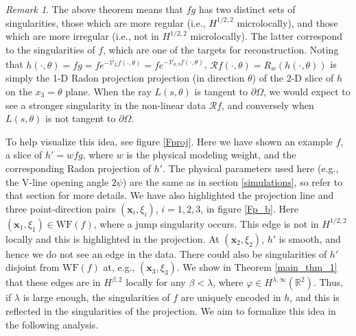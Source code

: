 \documentclass[a4paper,12pt]{amsart}
\numberwithin{equation}{section}
\theoremstyle{plain}
\numberwithin{theorem}{section}
\theoremstyle{definition}
\theoremstyle{remark}
\newtheorem{remark}[theorem]{Remark}
\theoremstyle{remark}
\theoremstyle{remark}
\newcommand{\WF}{\mathrm{WF}}                         %
\newcommand{\vx}{{\mathbf{x}}}
\newcommand{\seanc}[1]{\begin{quotation}\textbf{Sean's comment:\
}{\textit{#1}}\end{quotation}}
\begin{document}

\begin{remark}
The above theorem means that $fg$ has two distinct sets of singularities, those which are more regular (i.e., $H^{1/2,2}$ microlocally), and those which are more irregular (i.e., not in $H^{1/2,2}$ microlocally). The latter correspond to the singularities of $f$, which are one of the targets for reconstruction. Noting that $h(\cdot,\theta) = fg = f e^{ -\widetilde{\mathcal{V}_L}f(\cdot,\theta) } = f e^{ -\widetilde{\mathcal{V}_{a,b}}f(\cdot,\theta) }$, $\mathcal{R}f(\cdot,\theta) = R_w(h(\cdot, \theta))$ is simply the 1-D Radon projection projection (in direction $\theta$) of the 2-D slice of $h$ on the $x_3 = \theta$ plane. When the ray $L(s,\theta)$ is tangent to $\partial \Omega$, we would expect to see a stronger singularity in the non-linear data $\mathcal{R}f$, and conversely when $L(s,\theta)$ is not tangent to $\partial \Omega$. {To help visualize this idea, see figure \ref{Fproj}. Here we have shown an example $f$, a slice of $h' = wfg$, where $w$ is the physical modeling weight, and the corresponding Radon projection of $h'$. The physical parameters used here (e.g., the V-line opening angle $2\psi$) are the same as in section \ref{simulations}, so refer to that section for more details. We have also highlighted the projection line and three point-direction pairs $(\vx_i,\xi_i)$, $i = 1,2,3$, in figure \ref{Fp_b}. Here $(\vx_1,\xi_1) \in \WF(f)$, where a jump singularity occurs. This edge is not in $H^{1/2,2}$ locally and this is highlighted in the projection. At $(\vx_2,\xi_2)$, $h'$ is smooth, and hence we do not see an edge in the data. There could also be singularities of $h'$ disjoint from $\WF(f)$ at, e.g., $(\vx_3,\xi_3)$. We show in Theorem \ref{main_thm_1} that these edges are in $H^{\beta,2}$ locally for any $\beta < \lambda$, where $\varphi \in H^{\lambda,\infty}(\mathbb{R}^2)$. Thus, if $\lambda$ is large enough, the singularities of $f$ are uniquely encoded in $h$, and this is reflected in the singularities of the projection. We aim to formalize this idea in the following analysis.

}
\end{remark}
\end{document}
